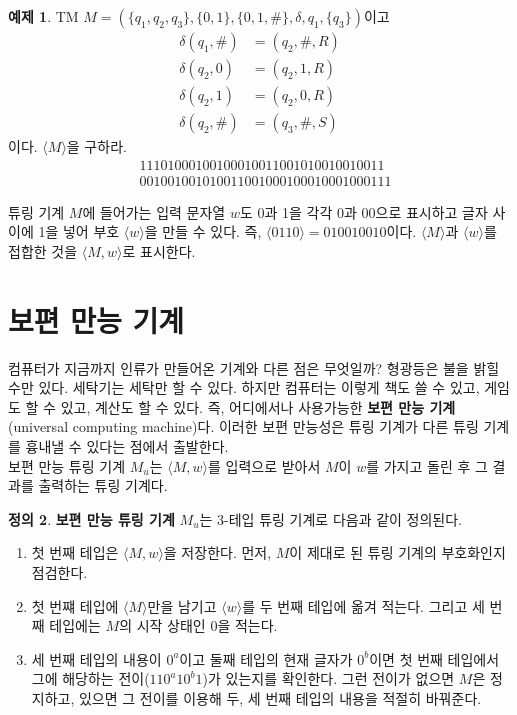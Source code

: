 \documentclass[b5paper, 11pt]{book}
\theoremstyle{definition}
\newtheorem{defn}{정의}[chapter]
\newtheorem{ex}[defn]{예제}
\begin{document}
\begin{ex}
    TM $M = (\{q_1, q_2, q_3\}, \{0, 1\}, \{0, 1, \#\}, \delta , q_1, \{q_3\})$이고 
    \begin{align*}
        \delta(q_1, \#) &= (q_2, \# , R) \\ 
        \delta(q_2, 0) &= (q_2, 1, R) \\ 
        \delta(q_2, 1) &= (q_2, 0, R) \\ 
        \delta(q_2, \#) &= (q_3, \#, S) 
    \end{align*}
    이다. $\langle M \rangle$을 구하라. 
    \begin{align*}
        &11101000100100010011001010010010011\\ 
        &001001001010011001000100010001000111
    \end{align*}
\end{ex}
튜링 기계 $M$에 들어가는 입력 문자열 $w$도 0과 1을 각각 0과 00으로 표시하고 글자 사이에 1을 넣어 
부호 $\langle w \rangle$을 만들 수 있다. 즉, $\langle 0110 \rangle = 010010010$이다. $\langle M \rangle$과
$\langle w \rangle$를 접합한 것을 $\langle M, w \rangle$로 표시한다. 
\section{보편 만능 기계}
컴퓨터가 지금까지 인류가 만들어온 기계와 다른 점은 무엇일까? 형광등은 불을 밝힐 수만 있다. 세탁기는 세탁만 할 수 있다.
하지만 컴퓨터는 이렇게 책도 쓸 수 있고, 게임도 할 수 있고, 계산도 할 수 있다. 즉, 어디에서나 사용가능한 
\textbf{보편 만능 기계}(universal computing machine)다. 이러한 보편 만능성은 튜링 기계가 다른 튜링 기계를 흉내낼 수 있다는 점에서 출발한다. \\ 
보편 만능 튜링 기계 $M_u$는 $\langle M, w\rangle$를 입력으로 받아서 $M$이 $w$를 가지고 돌린 후
그 결과를 출력하는 튜링 기계다. 
\begin{defn}
    \textbf{보편 만능 튜링 기계} $M_u$는 3-테입 튜링 기계로 다음과 같이 정의된다.
    \begin{enumerate}
        \item 첫 번째 테입은 $\langle M, w \rangle$을 저장한다. 먼저, $M$이 제대로 된 튜링 기계의
        부호화인지 점검한다. 
        \item 첫 번쨰 테입에 $\langle M \rangle$만을 남기고 $\langle w \rangle$를
        두 번째 테입에 옮겨 적는다. 그리고 세 번째 테입에는 $M$의 시작 상태인 $0$을 적는다. 
        \item 세 번째 테입의 내용이 $0^a$이고 둘째 테입의 현재 글자가 $0^b$이면 첫 번째 테입에서
        그에 해당하는 전이($110^a10^b1$)가 있는지를 확인한다. 그런 전이가 없으면 $M$은 정지하고, 있으면
        그 전이를 이용해 두, 세 번째 테입의 내용을 적절히 바꿔준다. 
    \end{enumerate}
\end{defn}
\end{document}
